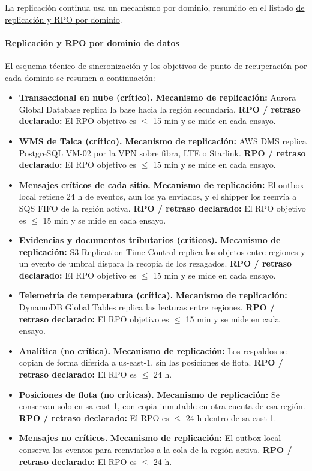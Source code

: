 La replicación continua usa un mecanismo por dominio, resumido en el listado \hyperref[tab:4-3-4]{de replicación y RPO por dominio}.

\paragraph*{Replicación y RPO por dominio de datos}
\label{tab:4-3-4}
El esquema técnico de sincronización y los objetivos de punto de recuperación por cada dominio se resumen a continuación:
\begin{itemize}
\item \textbf{Transaccional en nube (crítico).} \textbf{Mecanismo de replicación:} Aurora Global Database replica la base hacia la región secundaria. \textbf{RPO / retraso declarado:} El RPO objetivo es $\leq$ 15 min y se mide en cada ensayo.
\item \textbf{WMS de Talca (crítico).} \textbf{Mecanismo de replicación:} AWS DMS replica PostgreSQL VM-02 por la VPN sobre fibra, LTE o Starlink. \textbf{RPO / retraso declarado:} El RPO objetivo es $\leq$ 15 min y se mide en cada ensayo.
\item \textbf{Mensajes críticos de cada sitio.} \textbf{Mecanismo de replicación:} El outbox local retiene 24 h de eventos, aun los ya enviados, y el shipper los reenvía a SQS FIFO de la región activa. \textbf{RPO / retraso declarado:} El RPO objetivo es $\leq$ 15 min y se mide en cada ensayo.
\item \textbf{Evidencias y documentos tributarios (críticos).} \textbf{Mecanismo de replicación:} S3 Replication Time Control replica los objetos entre regiones y un evento de umbral dispara la recopia de los rezagados. \textbf{RPO / retraso declarado:} El RPO objetivo es $\leq$ 15 min y se mide en cada ensayo.
\item \textbf{Telemetría de temperatura (crítica).} \textbf{Mecanismo de replicación:} DynamoDB Global Tables replica las lecturas entre regiones. \textbf{RPO / retraso declarado:} El RPO objetivo es $\leq$ 15 min y se mide en cada ensayo.
\item \textbf{Analítica (no crítica).} \textbf{Mecanismo de replicación:} Los respaldos se copian de forma diferida a us-east-1, sin las posiciones de flota. \textbf{RPO / retraso declarado:} El RPO es $\leq$ 24 h.
\item \textbf{Posiciones de flota (no críticas).} \textbf{Mecanismo de replicación:} Se conservan solo en sa-east-1, con copia inmutable en otra cuenta de esa región. \textbf{RPO / retraso declarado:} El RPO es $\leq$ 24 h dentro de sa-east-1.
\item \textbf{Mensajes no críticos.} \textbf{Mecanismo de replicación:} El outbox local conserva los eventos para reenviarlos a la cola de la región activa. \textbf{RPO / retraso declarado:} El RPO es $\leq$ 24 h.
\end{itemize}


